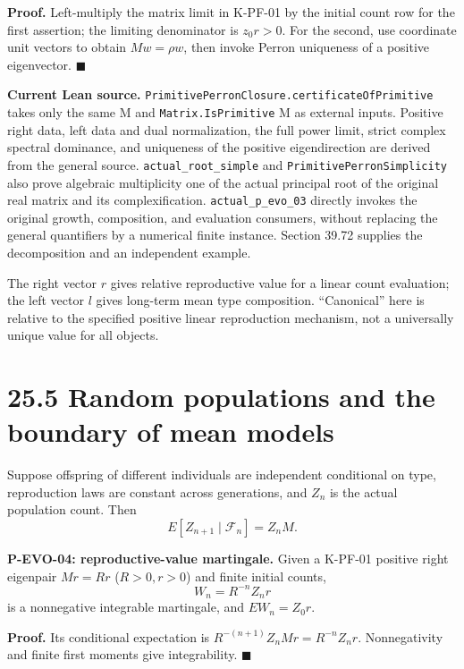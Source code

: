 \documentclass[
  english,
  11pt,
  oneside]{book}
\begin{document}
\textbf{Proof.} Left-multiply the matrix limit in K-PF-01 by the initial count row for the first assertion; the limiting denominator is \(z_0r>0\). For the second, use coordinate unit vectors to obtain \(Mw=\rho w\), then invoke Perron uniqueness of a positive eigenvector. \(\blacksquare\)

\textbf{Current Lean source.} \nolinkurl{PrimitivePerronClosure.certificateOfPrimitive} takes only the same M and \nolinkurl{Matrix.IsPrimitive} M as external inputs. Positive right data, left data and dual normalization, the full power limit, strict complex spectral dominance, and uniqueness of the positive eigendirection are derived from the general source. \nolinkurl{actual_root_simple} and \nolinkurl{PrimitivePerronSimplicity} also prove algebraic multiplicity one of the actual principal root of the original real matrix and its complexification. \nolinkurl{actual_p_evo_03} directly invokes the original growth, composition, and evaluation consumers, without replacing the general quantifiers by a numerical finite instance. Section 39.72 supplies the decomposition and an independent example.

The right vector \(r\) gives relative reproductive value for a linear count evaluation; the left vector \(l\) gives long-term mean type composition. ``Canonical'' here is relative to the specified positive linear reproduction mechanism, not a universally unique value for all objects.

\section{25.5 Random populations and the boundary of mean models}\label{random-populations-and-the-boundary-of-mean-models}

Suppose offspring of different individuals are independent conditional on type, reproduction laws are constant across generations, and \(Z_n\) is the actual population count. Then \[E[Z_{n+1}\mid\mathcal F_n]=Z_nM.\]

\hypertarget{p-evo-04}{}\label{p-evo-04}

\textbf{P-EVO-04: reproductive-value martingale.} Given a K-PF-01 positive right eigenpair \(Mr=Rr\) (\(R>0,r>0\)) and finite initial counts, \[W_n=R^{-n}Z_nr\] is a nonnegative integrable martingale, and \(EW_n=Z_0r\).

\textbf{Proof.} Its conditional expectation is \(R^{-(n+1)}Z_nMr=R^{-n}Z_nr\). Nonnegativity and finite first moments give integrability. \(\blacksquare\)
\end{document}

